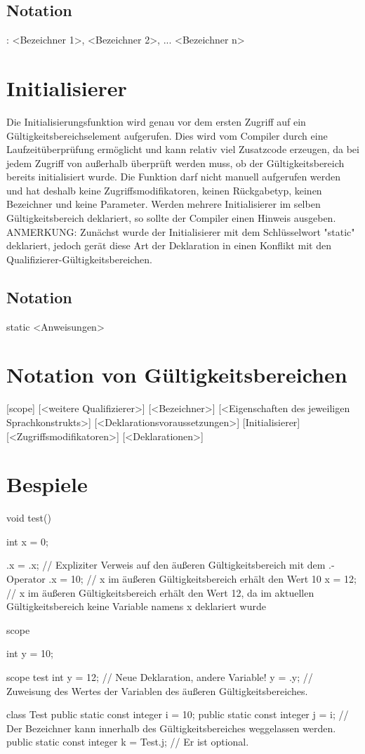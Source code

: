 \subsection{Notation}
: <Bezeichner 1>, <Bezeichner 2>, ... <Bezeichner n>

\section{Initialisierer}
Die Initialisierungsfunktion wird genau vor dem ersten Zugriff auf ein Gültigkeitsbereichselement aufgerufen.
Dies wird vom Compiler durch eine Laufzeitüberprüfung ermöglicht und kann relativ viel Zusatzcode erzeugen, da bei jedem Zugriff von außerhalb
überprüft werden muss, ob der Gültigkeitsbereich bereits initialisiert wurde.
Die Funktion darf nicht manuell aufgerufen werden und hat deshalb keine Zugriffsmodifikatoren, keinen Rückgabetyp, keinen Bezeichner und keine Parameter.
Werden mehrere Initialisierer im selben Gültigkeitsbereich deklariert, so sollte der Compiler einen Hinweis ausgeben.
ANMERKUNG: Zunächst wurde der Initialisierer mit dem Schlüsselwort "static" deklariert, jedoch gerät diese Art der Deklaration in einen Konflikt mit
den Qualifizierer-Gültigkeitsbereichen.

\subsection{Notation}
static { <Anweisungen> }

\section{Notation von Gültigkeitsbereichen}
[scope] [<weitere Qualifizierer>] [<Bezeichner>] [<Eigenschaften des jeweiligen Sprachkonstrukts>] [<Deklarationsvoraussetzungen>]
{
	[Initialisierer]
	[<Zugriffsmodifikatoren>] [<Deklarationen>]
}

\section{Bespiele}
void test()
{
	int x = 0;

	{
		.x = .x; // Expliziter Verweis auf den äußeren Gültigkeitsbereich mit dem .-Operator
		.x = 10; // x im äußeren Gültigkeitsbereich erhält den Wert 10
		x = 12; // x im äußeren Gültigkeitsbereich erhält den Wert 12, da im aktuellen Gültigkeitsbereich keine Variable namens x deklariert wurde
	}
}

scope
{
	int y = 10;

	scope test
	{
		int y = 12; // Neue Deklaration, andere Variable!
		y = .y; // Zuweisung des Wertes der Variablen des äußeren Gültigkeitsbereiches.
	}
}

class Test
{
	public static const integer i = 10;
	public static const integer j = i; // Der Bezeichner kann innerhalb des Gültigkeitsbereiches weggelassen werden.
	public static const integer k = Test.j; // Er ist optional.
}